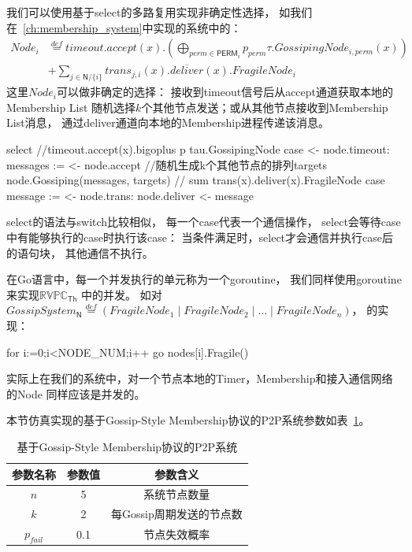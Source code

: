 我们可以使用基于select的多路复用实现非确定性选择，
如我们在~\ref{ch:membership_system}中实现的系统中的：
\begin{align*}
   Node_i&\stackrel{def}{=}timeout.accept(x).(\bigoplus_{perm\in \mathsf{PERM}_i} p_{perm}\tau.GossipingNode_{i,perm}(x))\\
     &+\sum_{j\in \mathsf{N}/\{i\}}trans_{j,i}(x).\overline{deliver}(x).FragileNode_i
\end{align*}
这里$Node_i$可以做非确定的选择：
接收到timeout信号后从accept通道获取本地的Membership List
随机选择$k$个其他节点发送；或从其他节点接收到Membership List消息，
通过deliver通道向本地的Membership进程传递该消息。

\begin{codeblock}[language=GO]
   select {
      //timeout.accept(x).bigoplus p tau.GossipingNode
      case <- node.timeout:
         messages := <- node.accept
         //随机生成k个其他节点的排列targets
         node.Gossiping(messages, targets)
      // sum trans(x).deliver(x).FragileNode
      case message := <- node.trans:
         node.deliver <- message
	}
\end{codeblock}
select的语法与switch比较相似，
每一个case代表一个通信操作，
select会等待case中有能够执行的case时执行该case：
当条件满足时，select才会通信并执行case后的语句块，
其他通信不执行。

在Go语言中，每一个并发执行的单元称为一个goroutine，
我们同样使用goroutine来实现$\mathbb{RVPC}_{\mathsf{Th}}$
中的并发。
如对$GossipSystem_\mathsf{N}\stackrel{def}{=}(FragileNode_1\mid FragileNode_2\mid \dots \mid FragileNode_n)$，
的实现：
\begin{codeblock}[language=GO]
   for i:=0;i<NODE_NUM;i++ {
        go nodes[i].Fragile()
    }
\end{codeblock}
实际上在我们的系统中，对一个节点本地的Timer，Membership和接入通信网络的Node
同样应该是并发的。

本节仿真实现的基于Gossip-Style Membership协议的P2P系统参数如表~\ref{tab:param}。
\begin{table}[!hpt]
   \caption[基于Gossip-Style Membership协议的P2P系统]{基于Gossip-Style Membership协议的P2P系统}
   \label{tab:param}
   \centering
   \begin{tabular}{@{}ccc@{}} \toprule
     参数名称 & 参数值 & 参数含义 \\ \midrule
     $n$ & 5 & 系统节点数量\\
     $k$ & 2 & 每Gossip周期发送的节点数\\
     $p_{fail}$ & 0.1 & 节点失效概率\\ \bottomrule
   \end{tabular}
 \end{table}

